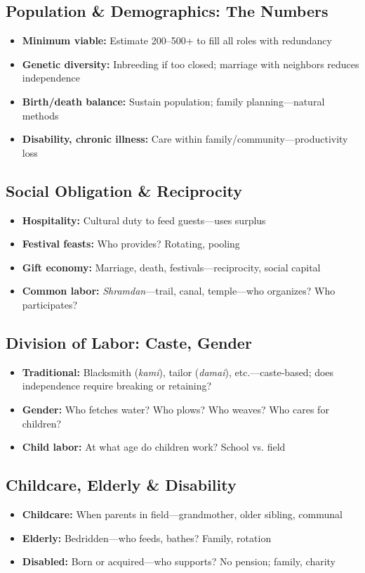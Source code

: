 \documentclass[11pt,a4paper]{article}
\begin{document}
\subsection{Population \& Demographics: The Numbers}
\begin{itemize}
    \item \textbf{Minimum viable:} Estimate 200--500+ to fill all roles with redundancy
    \item \textbf{Genetic diversity:} Inbreeding if too closed; marriage with neighbors reduces independence
    \item \textbf{Birth/death balance:} Sustain population; family planning---natural methods
    \item \textbf{Disability, chronic illness:} Care within family/community---productivity loss
\end{itemize}

\subsection{Social Obligation \& Reciprocity}
\begin{itemize}
    \item \textbf{Hospitality:} Cultural duty to feed guests---uses surplus
    \item \textbf{Festival feasts:} Who provides? Rotating, pooling
    \item \textbf{Gift economy:} Marriage, death, festivals---reciprocity, social capital
    \item \textbf{Common labor:} \textit{Shramdan}---trail, canal, temple---who organizes? Who participates?
\end{itemize}

\subsection{Division of Labor: Caste, Gender}
\begin{itemize}
    \item \textbf{Traditional:} Blacksmith (\textit{kami}), tailor (\textit{damai}), etc.---caste-based; does independence require breaking or retaining?
    \item \textbf{Gender:} Who fetches water? Who plows? Who weaves? Who cares for children?
    \item \textbf{Child labor:} At what age do children work? School vs. field
\end{itemize}

\subsection{Childcare, Elderly \& Disability}
\begin{itemize}
    \item \textbf{Childcare:} When parents in field---grandmother, older sibling, communal
    \item \textbf{Elderly:} Bedridden---who feeds, bathes? Family, rotation
    \item \textbf{Disabled:} Born or acquired---who supports? No pension; family, charity
\end{itemize}
\end{document}

